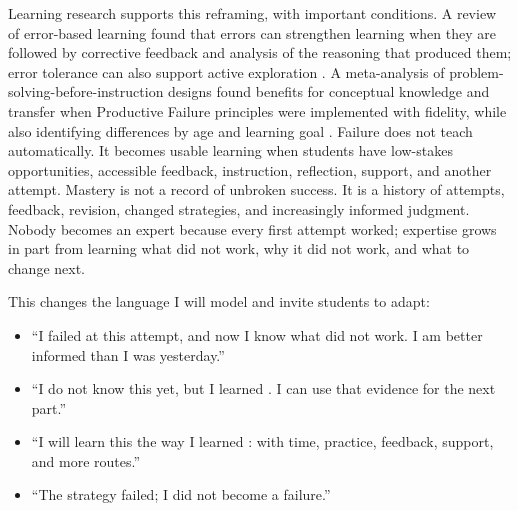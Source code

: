 \documentclass[11pt]{article}
\begin{document}
Learning research supports this reframing, with important conditions. A review of error-based learning found that errors can strengthen learning when they are followed by corrective feedback and analysis of the reasoning that produced them; error tolerance can also support active exploration \citep{metcalfe2017errors}. A meta-analysis of problem-solving-before-instruction designs found benefits for conceptual knowledge and transfer when Productive Failure principles were implemented with fidelity, while also identifying differences by age and learning goal \citep{sinha2021productivefailure}. Failure does not teach automatically. It becomes usable learning when students have low-stakes opportunities, accessible feedback, instruction, reflection, support, and another attempt. Mastery is not a record of unbroken success. It is a history of attempts, feedback, revision, changed strategies, and increasingly informed judgment. Nobody becomes an expert because every first attempt worked; expertise grows in part from learning what did not work, why it did not work, and what to change next.

This changes the language I will model and invite students to adapt:

\begin{itemize}
  \setlength{\itemsep}{2pt}
  \setlength{\parskip}{0pt}
  \setlength{\parsep}{0pt}
  \setlength{\topsep}{4pt}
  
  \item ``I failed at this attempt, and now I know what did not work. I am better informed than I was yesterday.''
  \item ``I do not know this yet, but I learned \underline{\hspace{0.75in}}. I can use that evidence for the next part.''
  \item ``I will learn this the way I learned \underline{\hspace{0.75in}}: with time, practice, feedback, support, and more routes.''
  \item ``The strategy failed; I did not become a failure.''
\end{itemize}
\end{document}

